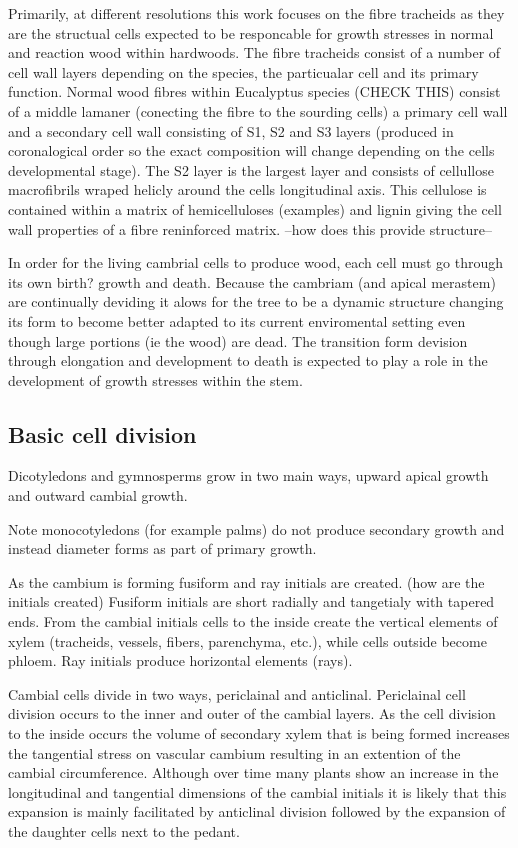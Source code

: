 \documentclass{article}
\begin{document}
Primarily, at different resolutions this work focuses on the fibre tracheids as
they are the structual cells expected to be responcable for growth stresses in
normal and reaction wood within hardwoods. The fibre tracheids consist of a
number of cell wall layers depending on the species, the particualar cell and
its primary function. Normal wood fibres within Eucalyptus species (CHECK THIS)
consist of a middle lamaner (conecting the fibre to the sourding cells) a
primary cell wall and a secondary cell wall consisting of S1, S2 and S3 layers
(produced in coronalogical order so the exact composition will change depending
on the cells developmental stage). The S2 layer is the largest layer and
consists of cellullose macrofibrils wraped helicly around the cells longitudinal
axis. This cellulose is contained within a matrix of hemicelluloses (examples)
and lignin giving the cell wall properties of a fibre reninforced matrix. --how
does this provide structure--

In order for the living cambrial cells to produce wood, each cell must go
through its own birth? growth and death. Because the cambriam (and apical
merastem) are continually deviding it alows for the tree to be a dynamic
structure changing its form to become better adapted to its current enviromental
setting even though large portions (ie the wood) are dead. The transition form
devision through elongation and development to death is expected to play a role
in the development of growth stresses within the stem.

\subsection{Basic cell division}
Dicotyledons and gymnosperms grow in two main ways, upward apical growth and
outward cambial growth.

Note monocotyledons (for example palms) do not produce secondary growth and instead diameter
forms as part of primary growth.

As the cambium is forming fusiform and ray initials are created.
(how are the initials created)
Fusiform initials are short radially and tangetialy with tapered
ends. From the cambial initials cells to the inside create the vertical elements
of xylem (tracheids, vessels, fibers, parenchyma, etc.), while cells outside become phloem.
Ray initials produce horizontal elements (rays).

Cambial cells divide in two ways, periclainal and anticlinal.
Periclainal cell division occurs to the inner and outer of the cambial layers.
As the cell division to the inside occurs the volume of secondary xylem that is being
formed increases the tangential stress on vascular cambium resulting in an
extention of the cambial circumference. Although over time many plants show an
increase in the longitudinal and tangential dimensions of the cambial initials it is
likely that this expansion is mainly facilitated by anticlinal division followed
by the expansion of the daughter cells next to the pedant.
\end{document}

